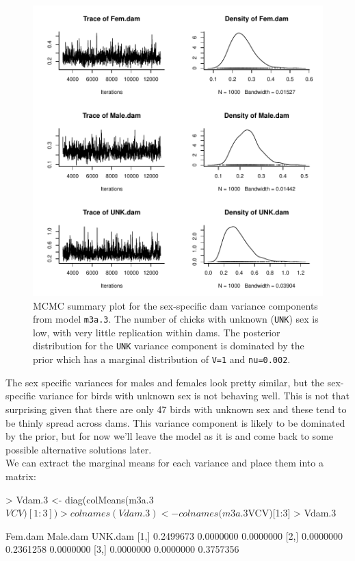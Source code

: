 \documentclass{article}
\begin{document}
\begin{figure}[!h]
\begin{center}
\includegraphics{Lecture3-019}
\end{center}
\caption{MCMC summary plot for the sex-specific dam variance components from model \texttt{m3a.3}. The number of chicks with unknown (\texttt{UNK}) sex is low, with very little replication within dams. The posterior distribution for the \texttt{UNK} variance component is dominated by the prior which has a marginal distribution of \texttt{V=1} and \texttt{nu=0.002}.}
\label{BTidh-fig}
\end{figure}

The sex specific variances for males and females look pretty similar, but the sex-specific variance for birds with unknown sex is not behaving well. This is not that surprising given that there are only 47 birds with unknown sex and these tend to be thinly spread across dams. This variance component is likely to be dominated by the prior, but for now we'll leave the model as it is and come back to some possible alternative solutions later.\\

We can extract the marginal means for each variance and place them into a matrix:

\begin{Schunk}
\begin{Sinput}
> Vdam.3 <- diag(colMeans(m3a.3$VCV)[1:3])
> colnames(Vdam.3) <- colnames(m3a.3$VCV)[1:3]
> Vdam.3
\end{Sinput}
\begin{Soutput}
       Fem.dam  Male.dam   UNK.dam
[1,] 0.2499673 0.0000000 0.0000000
[2,] 0.0000000 0.2361258 0.0000000
[3,] 0.0000000 0.0000000 0.3757356
\end{Soutput}
\end{Schunk}
\end{document}
